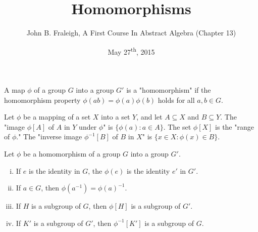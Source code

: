 \documentclass[a4paper,11pt]{article}
\title{Homomorphisms}
\author{John B. Fraleigh, A First Course In Abstract Algebra (Chapter 13)}
\date{May 27\textsuperscript{th}, 2015}
\begin{document}
\maketitle
{}

\begin{outline}

    A map \(\phi\) of a group \(G\) into a group \(G'\) is a "homomorphism" if the
    homomorphism property \(\phi(ab) = \phi(a)\phi(b)\) holds for all \(a, b \in G\).
    
    Let \(\phi\) be a mapping of a set \(X\) into a set \(Y\), and let \(A \subseteq X\)
    and \(B \subseteq Y\). The "image \(\phi[A]\) of \(A\) in \(Y\) under \(\phi\)" is \(\{\phi(a) : a \in A\}\).
    The set \(\phi[X]\) is the "range of \(\phi\)." The "inverse image \(\phi^{-1}[B]\) of \(B\) in \(X\)" is
    \(\{x \in X : \phi(x) \in B\}\).
    
    Let \(\phi\) be a homomorphism of a group \(G\) into a group \(G'\).
    \begin{enumerate}[i.]
      \item If \(e\) is the identity in \(G\), the \(\phi(e)\) is the identity \(e'\) in \(G'\).
      \item If \(a \in G\), then \(\phi(a^{-1}) = \phi(a)^{-1}\).
      \item If \(H\) is a subgroup of \(G\), then \(\phi[H]\) is a subgroup of \(G'\).
      \item If \(K'\) is a subgroup of \(G'\), then \(\phi^{-1}[K']\) is a subgroup of \(G\).
    \end{enumerate}
    

\end{outline}
\end{document}
